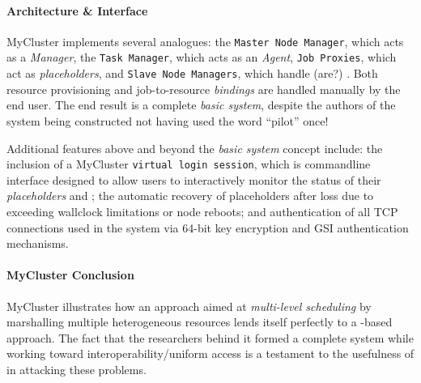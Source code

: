 \documentclass{sig-alternate}
\begin{document}
\paragraph{Architecture \& Interface}
MyCluster implements several \pilotjob analogues: the \texttt{Master
  Node Manager}, which acts as a \textit{\pilotjob Manager}, the
\texttt{Task Manager}, which acts as an \textit{\pilotjob Agent},
\texttt{Job Proxies}, which act as \textit{placeholders}, and
\texttt{Slave Node Managers}, which handle (are?) \textit{\pilotjob
  \cus}.  Both resource provisioning and job-to-resource \textit{bindings}
are handled manually by the end user.
The end result is a complete \textit{basic \pilotjob system}, despite the
authors of the system being constructed not having used the word ``pilot''
once!~\cite{1652061}  

Additional features above and beyond the \textit{basic \pilotjob system}
concept include: the inclusion of a MyCluster
\texttt{virtual login session}, which
is commandline interface designed to allow users to interactively
monitor the status of their \textit{placeholders} and \textit{\cus};
the automatic recovery of placeholders after loss due to exceeding wallclock
limitations or node reboots; and authentication of all TCP
connections used in the system via 64-bit key encryption and
GSI authentication mechanisms.

\paragraph{MyCluster Conclusion}
MyCluster illustrates how an approach aimed at \textit{multi-level
scheduling} by marshalling multiple heterogeneous resources lends
itself perfectly to a \pilotjob-based approach.  The fact that
the researchers behind it formed a complete \pilotjob system
while working toward interoperability/uniform access is a testament
to the usefulness of \pilotjobs in attacking these problems. 


\end{document}
